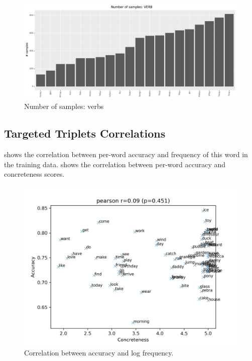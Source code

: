 \begin{figure}
  \centering
  \includegraphics[width=\textwidth]{results/targeted_triplets/num_samples_per_word_VERB.pdf}
  \caption{Number of samples: verbs}
  \label{fig:num_samples_VERB_word}
\end{figure}

\subsection{Targeted Triplets Correlations}\label{app:targeted_triplets_correlations}

 shows the correlation between per-word accuracy and frequency of this word in the training data.
 shows the correlation between per-word accuracy and concreteness scores.


\begin{figure}
  \centering
  \includegraphics[width=\columnwidth]{results/targeted_triplets/correlation_concreteness_acc_version_206980.png}
  \caption{Correlation between accuracy and log frequency.}
  \label{fig:results_correlation_frequency_acc}
\end{figure}

